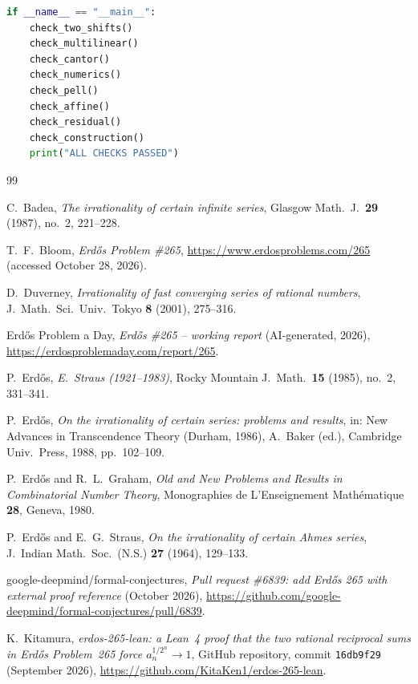 \documentclass[11pt]{amsart}
\theoremstyle{definition}
\theoremstyle{remark}
\begin{document}
\begin{lstlisting}[language=Python]
if __name__ == "__main__":
    check_two_shifts()
    check_multilinear()
    check_cantor()
    check_numerics()
    check_pell()
    check_affine()
    check_residual()
    check_construction()
    print("ALL CHECKS PASSED")
\end{lstlisting}

\begin{thebibliography}{99}

C.~Badea, \emph{The irrationality of certain infinite series},
Glasgow Math.\ J.\ \textbf{29} (1987), no.~2, 221--228.

T.~F.~Bloom, \emph{Erd\H{o}s Problem \#265},
\url{https://www.erdosproblems.com/265} (accessed October 28, 2026).

D.~Duverney, \emph{Irrationality of fast converging series of rational numbers},
J.\ Math.\ Sci.\ Univ.\ Tokyo \textbf{8} (2001), 275--316.

Erd\H{o}s Problem a Day, \emph{Erd\H{o}s \#265 -- working report} (AI-generated, 2026),
\url{https://erdosproblemaday.com/report/265}.

P.~Erd\H{o}s, \emph{E.~Straus (1921--1983)}, Rocky Mountain J.\ Math.\ \textbf{15}
(1985), no.~2, 331--341.

P.~Erd\H{o}s, \emph{On the irrationality of certain series: problems and results},
in: New Advances in Transcendence Theory (Durham, 1986), A.~Baker (ed.),
Cambridge Univ.\ Press, 1988, pp.~102--109.

P.~Erd\H{o}s and R.~L.~Graham, \emph{Old and New Problems and Results in Combinatorial
Number Theory}, Monographies de L'Enseignement Math\'ematique \textbf{28},
Geneva, 1980.

P.~Erd\H{o}s and E.~G.~Straus, \emph{On the irrationality of certain Ahmes series},
J.\ Indian Math.\ Soc.\ (N.S.) \textbf{27} (1964), 129--133.

google-deepmind/formal-conjectures, \emph{Pull request \#6839: add Erd\H{o}s 265 with
external proof reference} (October 2026),
\url{https://github.com/google-deepmind/formal-conjectures/pull/6839}.

K.~Kitamura, \emph{erdos-265-lean: a Lean~4 proof that the two rational reciprocal sums
in Erd\H{o}s Problem~265 force $a_n^{1/2^n}\to1$}, GitHub repository, commit
\texttt{16db9f29} (September 2026),
\url{https://github.com/KitaKen1/erdos-265-lean}.


\end{thebibliography}
\end{document}
